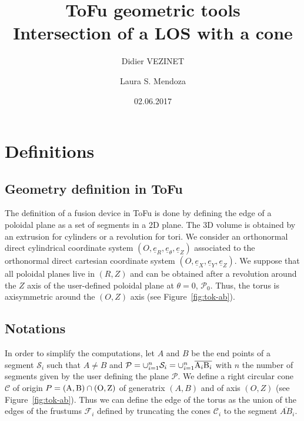 \documentclass[a4paper,11pt,twoside,titlepage,openright]{book}
\numberwithin{equation}{section}
\newcommand{\ud}[1]{\underline{#1}}
\begin{document}
\title{ToFu geometric tools\\ Intersection of a LOS with a cone}
\author{Didier VEZINET \and Laura S. Mendoza}
\date{02.06.2017}
\maketitle





\chapter{Definitions}

\section{Geometry definition in ToFu}

The definition of a fusion device in ToFu is done by defining the edge of a poloidal plane as a set of segments in a 2D plane. The 3D volume is obtained by an extrusion for cylinders or a revolution for tori.
We consider an orthonormal direct cylindrical coordinate system $(O,\ud{e}_R,\ud{e}_{\theta},\ud{e}_Z)$ associated to the orthonormal direct cartesian coordinate system $(O,\ud{e}_X,\ud{e}_Y,\ud{e}_Z)$. We suppose that all poloidal planes live in $(R,Z)$ and can be obtained after a revolution around the $Z$ axis of the user-defined poloidal plane at $\theta=0$, $\mathcal{P}_0$. Thus, the torus is axisymmetric around the $(O,Z)$ axis (see Figure~\ref{fig:tok-ab}).




\begin{figure}[h]
\end{figure}

\section{Notations}

In order to simplify the computations, let $A$ and $B$ be the end points of a segment $\mathcal{S}_i$ such that $A\neq B$ and $\mathcal{P} = \cup_{i=1}^{n} \mathcal{S}_i = \cup_{i=1}^n \overline{{\rm A}_i{\rm B}_i}$ with $n$ the number of segments given by the user defining the plane $\mathcal{P}$. We define a right circular cone $\mathcal{C}$ of origin $P = ({\rm A},{\rm B}) \cap ({\rm O}, {\rm Z})$ of generatrix $(A,B)$ and of axis $(O,Z)$ (see Figure~\ref{fig:tok-ab}). Thus we can define the edge of the torus as the union of the edges of the frustums $\mathcal{F}_i$ defined by truncating the cones $\mathcal{C}_i$ to the segment $\overline{AB}_i$.
\end{document}
